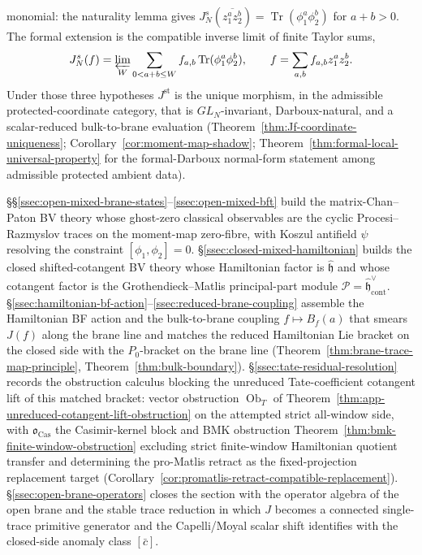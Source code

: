 \documentclass[11pt]{memoir}
\begin{document}
monomial: the naturality lemma gives
\(J_N^s(\overline{z_1^a z_2^b})
=\operatorname{Tr}(\phi_1^a\phi_2^b)\) for \(a+b>0\).  The
formal extension is the compatible inverse limit of finite Taylor sums,
\[
  J_N^s(f)=\varprojlim_W
  \sum_{0<a+b\leq W}f_{a,b}\operatorname{Tr}(\phi_1^a\phi_2^b),
  \qquad
  f=\sum_{a,b}f_{a,b}z_1^az_2^b .
\]
Under those three hypotheses \(J^{\mathrm{st}}\) is the unique morphism, in the
admissible protected-coordinate category, that is \(GL_N\)-invariant,
Darboux-natural, and a scalar-reduced bulk-to-brane evaluation
(Theorem~\ref{thm:Jf-coordinate-uniqueness};
Corollary~\ref{cor:moment-map-shadow};
Theorem~\ref{thm:formal-local-universal-property} for the
formal-Darboux normal-form statement among admissible protected
ambient data).

\S\S\ref{ssec:open-mixed-brane-states}--\ref{ssec:open-mixed-bft}
build the matrix-Chan--Paton BV theory whose ghost-zero classical
observables are the cyclic Procesi--Razmyslov traces on the
moment-map zero-fibre, with Koszul antifield \(\psi\) resolving the
constraint \([\phi_1,\phi_2]=0\). \S\ref{ssec:closed-mixed-hamiltonian} builds the
closed shifted-cotangent BV theory whose Hamiltonian factor is
\(\widehat{\mathfrak h}\) and whose cotangent factor is the
Grothendieck--Matlis principal-part module \(\mathcal P=
\widehat{\mathfrak h}^\vee_{\mathrm{cont}}\).
\S\ref{ssec:hamiltonian-bf-action}--\ref{ssec:reduced-brane-coupling}
assemble the Hamiltonian BF action and the bulk-to-brane coupling
\(f\mapsto B_f(a)\) that smears \(J(f)\) along the brane line and
matches the reduced Hamiltonian Lie bracket on the closed side with the
\(P_0\)-bracket on the brane line
(Theorem~\ref{thm:brane-trace-map-principle},
Theorem~\ref{thm:bulk-boundary}). \S\ref{ssec:tate-residual-resolution}
records the obstruction calculus blocking the unreduced
Tate-coefficient cotangent lift of this matched bracket: vector
obstruction \(\operatorname{Ob}_T\) of
Theorem~\ref{thm:app-unreduced-cotangent-lift-obstruction} on the
attempted strict all-window side, with \(\mathfrak o_{\mathrm{Cas}}\) the
Casimir-kernel block and BMK obstruction
Theorem~\ref{thm:bmk-finite-window-obstruction} excluding strict
finite-window Hamiltonian quotient transfer and determining the
pro-Matlis retract as the fixed-projection replacement target
(Corollary~\ref{cor:promatlis-retract-compatible-replacement}).
\S\ref{ssec:open-brane-operators} closes the section with the operator
algebra of the open brane and the stable trace reduction in which
\(J\) becomes a connected single-trace primitive generator and the
Capelli/Moyal scalar shift identifies with the closed-side anomaly
class \([\bar c]\).
\end{document}
